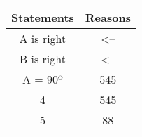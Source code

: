 \hskip-0.5cm\begin{tabular}{|c | c|} 
	\hline
	Statements & Reasons \\ [0.5ex] 
	\hline\hline
	\angle A is right & <--  \\ 
	\hline
	\angle B is right & <--  \\
	\hline
	\angle A = 90º & 545 \\
	\hline
	4 & 545  \\
	\hline
	5 & 88  \\ [1ex] 
	\hline
\end{tabular}